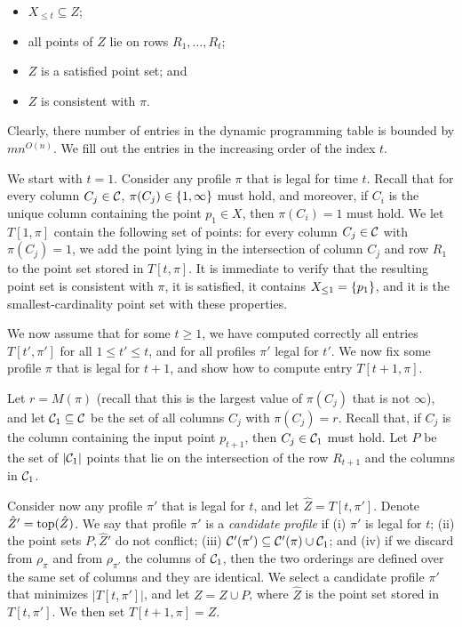 \documentclass[11pt]{article}
\numberwithin{equation}{section}
\theoremstyle{definition}
\theoremstyle{plain}
\begin{document}
\begin{itemize}
	\item $X_{\leq t}\subseteq Z$;
	\item all points of $Z$ lie on rows $R_1,\ldots, R_t$;
\item 	$Z$ is a satisfied point set; and 
\item $Z$ is consistent with $\pi$.
\end{itemize}



Clearly, there number of entries in the dynamic programming table is bounded by $m n^{O(n)}$. We fill out the entries in the increasing order of the index $t$.  

We start with $t=1$. Consider any profile $\pi$ that is legal for time $t$. Recall that for every column $C_j\in {\mathcal C}$, $\pi(C_j)\in \left\{ 1,\infty \right\}$ must hold, and moreover, if $C_i$ is the unique column containing the point $p_1\in X$, then $\pi(C_i)=1$ must hold.
We let $T[1,\pi]$ contain the following set of points: for every column $C_j\in {\mathcal C}$ with $\pi(C_j)=1$, we add the point lying in the intersection of column $C_j$ and row $R_1$ to the point set stored in $T[t,\pi]$. It is immediate to verify that the resulting point set is consistent with $\pi$, it is satisfied, it contains $X_{\leq 1}=\left\{ p_1 \right\}$, and it is the smallest-cardinality point set with these properties.

We now assume that for some $t\geq 1$, we have computed correctly all entries $T[t',\pi']$ for all $1\leq t'\leq t$, and for all profiles $\pi'$ legal for $t'$. We now fix some profile $\pi$ that is legal for $t+1$, and show how to compute entry $T[t+1,\pi]$.

Let $r=M(\pi)$ (recall that this is the largest value of $\pi(C_j)$ that is not $\infty$), and let ${\mathcal C}_1\subseteq {\mathcal C}$ be the set of all columns $C_j$ with $\pi(C_j)=r$. Recall that, if $C_j$ is the column containing the input point $p_{t+1}$, then $C_j\in {\mathcal C}_1$ must hold. Let $P$ be the set of $|{\mathcal C}_1|$ points that lie on the intersection of the row $R_{t+1}$ and the columns in ${\mathcal C}_1$.

Consider now any profile $\pi'$ that is legal for $t$, and let $\hat Z=T[t,\pi']$. Denote $\hat Z'=\operatorname{top}(\hat Z)$. We say that profile $\pi'$ is a \emph{candidate profile} if (i) $\pi'$ is legal for $t$; (ii) the point sets $P,\hat Z'$ do not conflict; (iii) ${\mathcal C}'(\pi')\subseteq {\mathcal C}'(\pi)\cup {\mathcal C}_1$; and (iv) if we discard from $\rho_{\pi}$ and from $\rho_{\pi'}$ the columns of ${\mathcal C}_1$, then the two orderings are defined over the same set of columns and they are identical. We select a candidate profile $\pi'$ that minimizes $|T[t,\pi']|$, and let $Z=\hat Z\cup P$, where $\hat Z$ is the point set stored in $T[t,\pi']$. We then set $T[t+1,\pi]=Z$.
\end{document}
